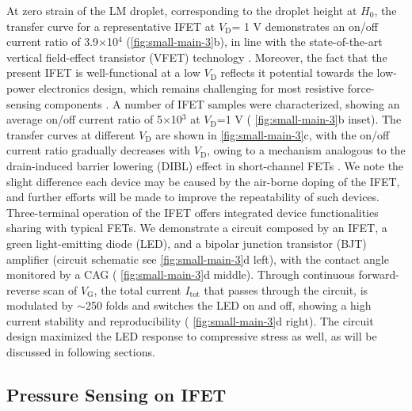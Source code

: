 %
At zero strain of the LM droplet,  corresponding to the droplet height at \(H_{0}\),
the transfer curve for a representative IFET at \(V_{\mathrm{D}}\)= 1
V demonstrates an on/off current ratio of
3.9\(\times\)10\(^{\text{4}}\) (\autoref{fig:small-main-3}b), in line
with the state-of-the-art vertical field-effect transistor (VFET)
technology
\cite{Yang_2012_Barristor,Shih_2015_PartiallyScreened,Sun_2017_COF_VFET,Ben_Sasson_2014_fet_rev}.
%
Moreover,
the fact that the present IFET is well-functional at a low
\(V_{\mathrm{D}}\) reflects it potential towards the low-power
electronics design, which remains challenging for most resistive
force-sensing components \cite{Pan_2014_pressure,Pang_2012_gauge}. A
number of IFET samples were characterized, showing an average on/off
current ratio of 5\(\times\)10\(^{\text{3}}\) at \(V_{\mathrm{D}}\)=1
V ( \autoref{fig:small-main-3}b inset). The transfer curves at
different \(V_{\mathrm{D}}\) are shown in \autoref{fig:small-main-3}c,
with the on/off current ratio gradually decreases with
\(V_{\mathrm{D}}\), owing to a mechanism analogous to the
drain-induced barrier lowering (DIBL) effect in short-channel FETs
\cite{Lundstrom_2003_moore}. We note the slight difference each device
may be caused by the air-borne doping of the IFET, and further efforts
will be made to improve the repeatability of such devices.
Three-terminal operation of the IFET offers integrated
device functionalities sharing with typical FETs. We demonstrate a
circuit composed by an IFET, a green light-emitting diode (LED), and a
bipolar junction transistor (BJT) amplifier (circuit schematic see
\autoref{fig:small-main-3}d left), with the contact angle monitored by
a CAG ( \autoref{fig:small-main-3}d middle). Through continuous
forward-reverse scan of \(V_{\mathrm{G}}\), the total current
\(I_{\mathrm{tot}}\) that passes through the circuit, is modulated by
\(\sim\)250 folds and switches the LED on and off, showing a high
current stability and reproducibility ( \autoref{fig:small-main-3}d
right). The circuit design maximized the LED response to compressive
stress as well, as will be
discussed in following sections.

\subsection{Pressure Sensing on IFET}
\label{sec:press-sens-ifet}

